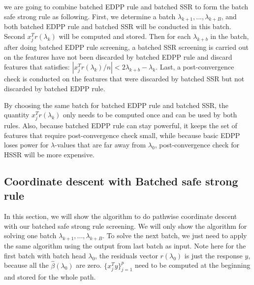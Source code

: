 \documentclass{article}
\begin{document}
we are going to combine batched EDPP rule and batched SSR to form the batch safe strong rule as following. First, we determine a batch $\lambda_{k+1},...,\lambda_{k+B}$, and both batched EDPP rule and batched SSR will be conducted in this batch. Second $x_j^Tr(\lambda_k)$ will be computed and stored. Then for each $\lambda_{k+b}$ in the batch, after doing batched EDPP rule screening, a batched SSR screening is carried out on the features have not been discarded by batched EDPP rule and discard features that satisfies: $|x_j^Tr(\lambda_k)/n|<2\lambda_{k+b}-\lambda_k$. Last, a post-convergence check is conducted on the features that were discarded by batched SSR but not discarded by batched EDPP rule.

By choosing the same batch for batched EDPP rule and batched SSR, the quantity $x_j^Tr(\lambda_k)$ only needs to be computed once and can be used by both rules. Also, because batched EDPP rule can stay powerful, it keeps the set of features that require post-convergence check small, while because basic EDPP loses power for $\lambda$-values that are far away from $\lambda_0$, post-convergence check for HSSR will be more expensive.

\subsection{Coordinate descent with Batched safe strong rule}

In this section, we will show the algorithm to do pathwise coordinate descent with our batched safe strong rule screening. We will only show the algorithm for solving one batch $\lambda_{k+1},...,\lambda_{k+B}$. To solve the next batch, we just need to apply the same algorithm using the output from last batch as input. Note here for the first batch with batch head $\lambda_0$, the residuals vector $r(\lambda_0)$ is just the response $y$, because all the $\hat{\beta}(\lambda_0)$ are zero. $\{x_j^Ty\}_{j=1}^p$ need to be computed at the beginning and stored for the whole path.
\end{document}
